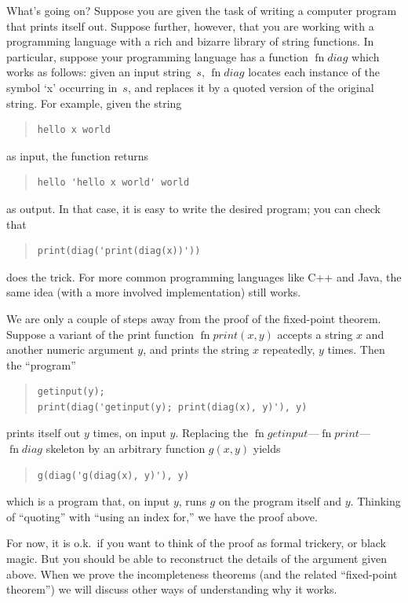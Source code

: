 \documentclass[10pt,a4paper]{article}
\theoremstyle{plain}
\theoremstyle{definition}
\theoremstyle{remark}
\newenvironment{explain}{}{}
\providecommand{\fn}{\operatorname{fn}}
\begin{document}
\begin{explain}
What's going on? Suppose you are given the task of writing a computer
program that prints itself out. Suppose further, however, that you are
working with a programming language with a rich and bizarre library of
string functions. In particular, suppose your programming language has
a function $\fn{diag}$ which works as follows: given an input
string~$s$, $\fn{diag}$ locates each instance of the symbol `x'
occurring in~$s$, and replaces it by a quoted version of the original
string. For example, given the string
\begin{quote}
\begin{verbatim}
hello x world
\end{verbatim}
\end{quote}
as input, the function returns
\begin{quote}
\begin{verbatim}
hello 'hello x world' world
\end{verbatim}
\end{quote}
as output. In that case, it is easy to write the desired program; you
can check that
\begin{quote}
\begin{verbatim}
print(diag('print(diag(x))'))
\end{verbatim}
\end{quote}
does the trick. For more common programming languages like C++ and
Java, the same idea (with a more involved implementation) still works.

We are only a couple of steps away from the proof of the fixed-point
theorem. Suppose a variant of the print function $\fn{print}(x,y)$
accepts a string $x$ and another numeric argument $y$, and prints the
string $x$ repeatedly, $y$ times. Then the ``program''
\begin{quote}
\begin{verbatim}
getinput(y);
print(diag('getinput(y); print(diag(x), y)'), y)
\end{verbatim}
\end{quote}
prints itself out $y$ times, on input $y$. Replacing the
$\fn{getinput}$---$\fn{print}$---$\fn{diag}$ skeleton by an
arbitrary function $g(x,y)$ yields
\begin{quote}
\begin{verbatim}
g(diag('g(diag(x), y)'), y)
\end{verbatim}
\end{quote}
which is a program that, on input $y$, runs $g$ on the program itself
and $y$. Thinking of ``quoting'' with ``using an index for,'' we have
the proof above.

For now, it is o.k.\ if you want to think of the proof as formal
trickery, or black magic. But you should be able to reconstruct the
details of the argument given above. When we prove the incompleteness
theorems (and the related ``fixed-point theorem'') we will discuss
other ways of understanding why it works.
\end{explain}
\end{document}
